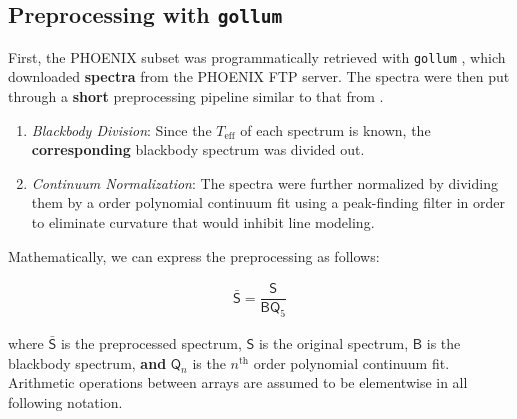 \documentclass[twocolumn, linenumbers]{aastex631}
\begin{document}
\subsection{Preprocessing with \texttt{gollum}}
First, the PHOENIX subset was programmatically retrieved with \texttt{gollum} \textbf{\citep{gollum}}, which downloaded \textbf{spectra} from the PHOENIX FTP server. The spectra were then put through a \textbf{short} preprocessing pipeline similar to that from \citealt{blase}.
\begin{enumerate}
    \item \textit{Blackbody Division}: Since the $T_{\mathrm{eff}}$ of each spectrum is known, the \textbf{corresponding} blackbody spectrum was divided out.
    \item \textit{Continuum Normalization}: The spectra were further normalized by dividing them by a  order polynomial continuum fit using a peak-finding filter in order to eliminate curvature that would inhibit line modeling.
\end{enumerate}
Mathematically, we can express the preprocessing as follows:
\begin{linenomath*}
\begin{gather}
    \mathsf{\bar{S}} = \dfrac{\mathsf{S}}{\mathsf{B}\mathsf{Q}_5}
\end{gather}
\end{linenomath*}
where $\mathsf{\bar{S}}$ is the preprocessed spectrum, $\mathsf{S}$ is the original spectrum,  $\mathsf{B}$ is the blackbody spectrum, \textbf{and} $\mathsf{Q}_n$ is the $n^\mathrm{th}$ order polynomial continuum fit.
Arithmetic operations between arrays are assumed to be elementwise in all following notation.
\end{document}
